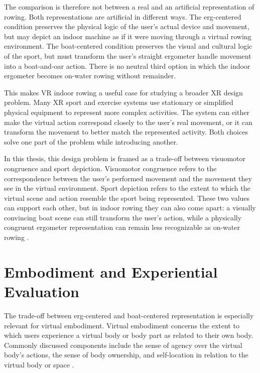 The comparison is therefore not between a real and an artificial representation of rowing. Both representations are artificial in different ways. The erg-centered condition preserves the physical logic of the user's actual device and movement, but may depict an indoor machine as if it were moving through a virtual rowing environment. The boat-centered condition preserves the visual and cultural logic of the sport, but must transform the user's straight ergometer handle movement into a boat-and-oar action. There is no neutral third option in which the indoor ergometer becomes on-water rowing without remainder.

This makes VR indoor rowing a useful case for studying a broader XR design problem. Many XR sport and exercise systems use stationary or simplified physical equipment to represent more complex activities. The system can either make the virtual action correspond closely to the user's real movement, or it can transform the movement to better match the represented activity. Both choices solve one part of the problem while introducing another.

In this thesis, this design problem is framed as a trade-off between visuomotor congruence and sport depiction. Visuomotor congruence refers to the correspondence between the user's performed movement and the movement they see in the virtual environment. Sport depiction refers to the extent to which the virtual scene and action resemble the sport being represented. These two values can support each other, but in indoor rowing they can also come apart: a visually convincing boat scene can still transform the user's action, while a physically congruent ergometer representation can remain less recognizable as on-water rowing \parencite{harrisEtAl2019visionForAction,kilteniEtAl2012senseEmbodiment,lamb1989kinematicComparison,rauterEtAl2013rowingTransfer}.

\section{Embodiment and Experiential Evaluation}
\label{sec:introduction_embodiment_experience}

The trade-off between erg-centered and boat-centered representation is especially relevant for virtual embodiment. Virtual embodiment concerns the extent to which users experience a virtual body or body part as related to their own body. Commonly discussed components include the sense of agency over the virtual body's actions, the sense of body ownership, and self-location in relation to the virtual body or space \parencite{kilteniEtAl2012senseEmbodiment}.

